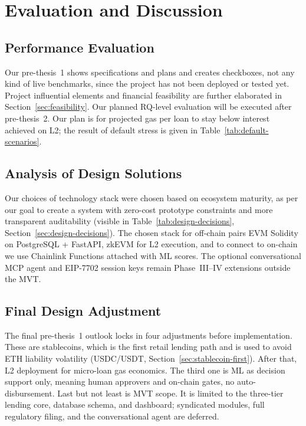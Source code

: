 \documentclass[12pt, a4paper]{report}
\begin{document}
\chapter{Evaluation and Discussion}
\label{ch:evaluation-compressed}

\section{Performance Evaluation}
\label{sec:performance-eval}
\label{sec:cost-model}
\label{sec:gas-cost}
\label{sec:eval-method}

Our pre-thesis~1 shows specifications and plans and creates checkboxes, not any kind of live benchmarks, since the project has not been deployed or tested yet. Project influential elements and financial feasibility are further elaborated in Section~\ref{sec:feasibility}. Our planned RQ-level evaluation will be executed after pre-thesis~2. Our plan is for projected gas per loan to stay below interest achieved on L2; the result of default stress is given in Table~\ref{tab:default-scenarios}.

\section{Analysis of Design Solutions}
\label{sec:design-solutions-ch5}

Our choices of technology stack were chosen based on ecosystem maturity, as per our goal to create a system with zero-cost prototype constraints and more transparent auditability (visible in Table~\ref{tab:design-decisions}, Section~\ref{sec:design-decisions}). The chosen stack for off-chain pairs EVM Solidity on PostgreSQL + FastAPI, zkEVM for L2 execution, and to connect to on-chain we use Chainlink Functions attached with ML scores. The optional conversational MCP agent and EIP-7702 session keys remain Phase~III--IV extensions outside the MVT.

\section{Final Design Adjustment}
\label{sec:final-design-adjustment}

The final pre-thesis~1 outlook locks in four adjustments before implementation. These are stablecoins, which is the first retail lending path and is used to avoid ETH liability volatility (USDC/USDT, Section~\ref{sec:stablecoin-first}). After that, L2 deployment for micro-loan gas economics. The third one is ML as decision support only, meaning human approvers and on-chain gates, no auto-disbursement. Last but not least is MVT scope. It is limited to the three-tier lending core, database schema, and dashboard; syndicated modules, full regulatory filing, and the conversational agent are deferred.
\end{document}
